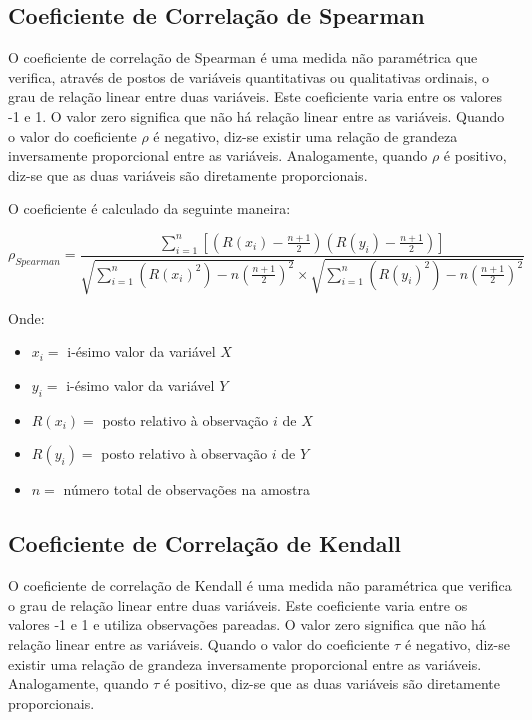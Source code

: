 \documentclass[
]{estat/estat}
\providecommand{\tightlist}{%
  \setlength{\itemsep}{0pt}\setlength{\parskip}{0pt}}\usepackage{longtable,booktabs,array}
\begin{document}
\hypertarget{coeficiente-de-correlauxe7uxe3o-de-spearman}{%
\subsection{Coeficiente de Correlação de
Spearman}\label{coeficiente-de-correlauxe7uxe3o-de-spearman}}

O coeficiente de correlação de Spearman é uma medida não paramétrica que
verifica, através de postos de variáveis quantitativas ou qualitativas
ordinais, o grau de relação linear entre duas variáveis. Este
coeficiente varia entre os valores -1 e 1. O valor zero significa que
não há relação linear entre as variáveis. Quando o valor do coeficiente
\(\rho\) é negativo, diz-se existir uma relação de grandeza inversamente
proporcional entre as variáveis. Analogamente, quando \(\rho\) é
positivo, diz-se que as duas variáveis são diretamente proporcionais.

O coeficiente é calculado da seguinte maneira:

\[
\rho_{Spearman} = \frac{ \displaystyle \sum_{i=1}^{n}  \left[\left(R(x_i)-\frac{n+1}{2}\right)\left(R(y_i)-\frac{n+1}{2}\right)\right]}
{\sqrt{\displaystyle \sum_{i=1}^{n}  \left(R(x_i)^2\right)-n\left(\frac{n+1}{2}\right)^{2}}  \times \sqrt{\displaystyle \sum_{i=1}^{n}  \left(R(y_i)^2 \right) -n\left(\frac{n+1}{2}\right)^{2}}}
\]

Onde:

\begin{itemize}
\tightlist
\item
  \(x_i =\) i-ésimo valor da variável \(X\)
\item
  \(y_i =\) i-ésimo valor da variável \(Y\)
\item
  \(R(x_i) =\) posto relativo à observação \(i\) de \(X\)
\item
  \(R(y_i) =\) posto relativo à observação \(i\) de \(Y\)
\item
  \(n =\) número total de observações na amostra
\end{itemize}

\hypertarget{coeficiente-de-correlauxe7uxe3o-de-kendall}{%
\subsection{Coeficiente de Correlação de
Kendall}\label{coeficiente-de-correlauxe7uxe3o-de-kendall}}

O coeficiente de correlação de Kendall é uma medida não paramétrica que
verifica o grau de relação linear entre duas variáveis. Este coeficiente
varia entre os valores -1 e 1 e utiliza observações pareadas. O valor
zero significa que não há relação linear entre as variáveis. Quando o
valor do coeficiente \(\tau\) é negativo, diz-se existir uma relação de
grandeza inversamente proporcional entre as variáveis. Analogamente,
quando \(\tau\) é positivo, diz-se que as duas variáveis são diretamente
proporcionais.
\end{document}
